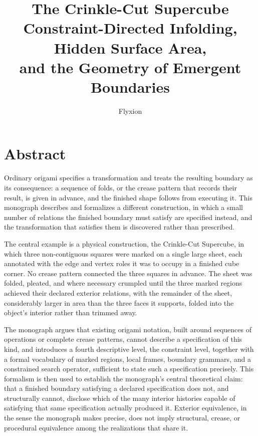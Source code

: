 \documentclass[11pt,oneside]{book}
\title{\textbf{The Crinkle-Cut Supercube}\\[0.5em]
\large Constraint-Directed Infolding, Hidden Surface Area,\\
and the Geometry of Emergent Boundaries}
\author{Flyxion}
\date{}
\begin{document}
\pagestyle{plain}

\frontmatter

\maketitle

\hypertarget{abstract}{%
\chapter*{Abstract}
\label{abstract}}

Ordinary origami specifies a transformation and treats the resulting
boundary as its consequence: a sequence of folds, or the crease pattern
that records their result, is given in advance, and the finished shape
follows from executing it. This monograph describes and formalizes a
different construction, in which a small number of relations the
finished boundary must satisfy are specified instead, and the
transformation that satisfies them is discovered rather than prescribed.

The central example is a physical construction, the Crinkle-Cut
Supercube, in which three non-contiguous squares were marked on a single
large sheet, each annotated with the edge and vertex roles it was to
occupy in a finished cube corner. No crease pattern connected the three
squares in advance. The sheet was folded, pleated, and where necessary
crumpled until the three marked regions achieved their declared exterior
relations, with the remainder of the sheet, considerably larger in area
than the three faces it supports, folded into the object's interior
rather than trimmed away.

The monograph argues that existing origami notation, built around
sequences of operations or complete crease patterns, cannot describe a
specification of this kind, and introduces a fourth descriptive level,
the constraint level, together with a formal vocabulary of marked
regions, local frames, boundary grammars, and a constrained search
operator, sufficient to state such a specification precisely. This
formalism is then used to establish the monograph's central theoretical
claim: that a finished boundary satisfying a declared specification does
not, and structurally cannot, disclose which of the many interior
histories capable of satisfying that same specification actually
produced it. Exterior equivalence, in the sense the monograph makes
precise, does not imply structural, crease, or procedural equivalence
among the realizations that share it.
\end{document}
